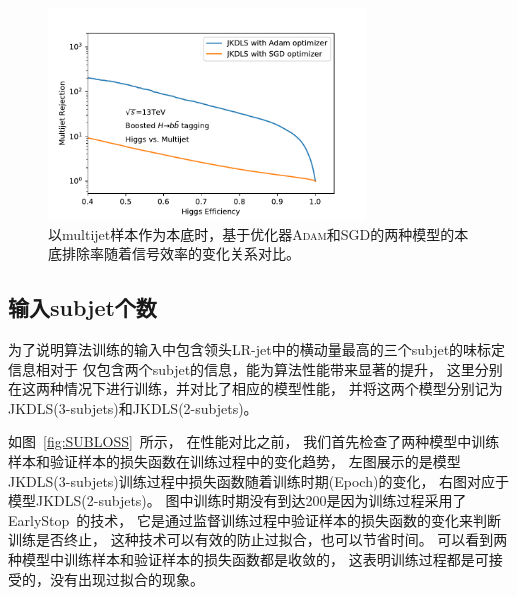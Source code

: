 \begin{figure}
  \begin{center}
    \includegraphics[width=0.75\textwidth]{figuresXbb/XbbTagger2a.pdf}
  \end{center}
  \caption{
  以multijet样本作为本底时，基于优化器\textsc{Adam}和\textsc{SGD}的两种模型的本底排除率随着信号效率的变化关系对比。
  }
    \label{fig:XbbTagger2}
\end{figure}


\subsection{输入subjet个数}
\label{sec:XbbTagger25}

为了说明算法训练的输入中包含领头LR-jet中的横动量最高的三个subjet的味标定信息相对于
仅包含两个subjet的信息，能为算法性能带来显著的提升，
这里分别在这两种情况下进行训练，并对比了相应的模型性能，
并将这两个模型分别记为JKDLS(3-subjets)和JKDLS(2-subjets)。

如图~\ref{fig:SUBLOSS}~所示，
在性能对比之前，
我们首先检查了两种模型中训练样本和验证样本的损失函数在训练过程中的变化趋势，
左图展示的是模型JKDLS(3-subjets)训练过程中损失函数随着训练时期(Epoch)的变化，
右图对应于模型JKDLS(2-subjets)。
图中训练时期没有到达200是因为训练过程采用了EarlyStop~\cite{EarlyStop}的技术，
它是通过监督训练过程中验证样本的损失函数的变化来判断训练是否终止，
这种技术可以有效的防止过拟合，也可以节省时间。
可以看到两种模型中训练样本和验证样本的损失函数都是收敛的，
这表明训练过程都是可接受的，没有出现过拟合的现象。

